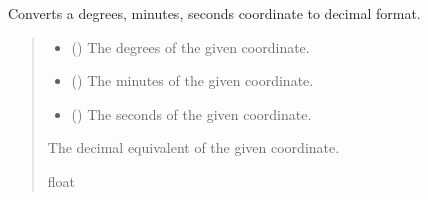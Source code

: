 \documentclass[letterpaper,10pt,english]{sphinxmanual}
\begin{document}
\begin{fulllineitems}
\label{\detokenize{modules/util/transformations:qnav.util.transformations.deg2dec}}
\pysigstartsignatures
{}
\pysigstopsignatures
\sphinxAtStartPar
Converts a degrees, minutes, seconds coordinate to decimal format.
\begin{quote}\begin{description}
\begin{itemize}
\item {} 
\sphinxAtStartPar
{} () \textendash{} The degrees of the given coordinate.

\item {} 
\sphinxAtStartPar
{} () \textendash{} The minutes of the given coordinate.

\item {} 
\sphinxAtStartPar
{} () \textendash{} The seconds of the given coordinate.

\end{itemize}

\sphinxAtStartPar
The decimal equivalent of the given coordinate.

\sphinxAtStartPar
float

\end{description}\end{quote}

\end{fulllineitems}

\end{document}
